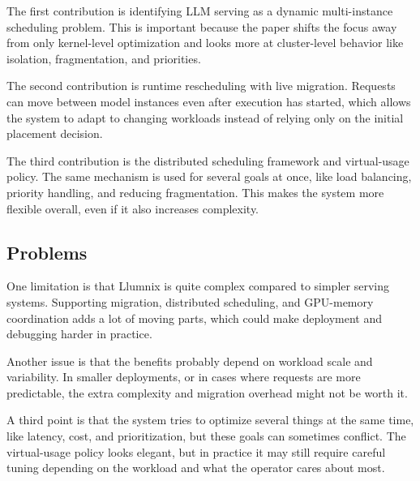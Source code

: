 \documentclass[a4paper, 12pt]{article}
\begin{document}
The first contribution is identifying LLM serving as a dynamic multi-instance scheduling problem. This is important because the paper shifts the focus away from only kernel-level optimization and looks more at cluster-level behavior like isolation, fragmentation, and priorities.

The second contribution is runtime rescheduling with live migration. Requests can move between model instances even after execution has started, which allows the system to adapt to changing workloads instead of relying only on the initial placement decision.

The third contribution is the distributed scheduling framework and virtual-usage policy. The same mechanism is used for several goals at once, like load balancing, priority handling, and reducing fragmentation. This makes the system more flexible overall, even if it also increases complexity.

\subsection{Problems}

One limitation is that Llumnix is quite complex compared to simpler serving systems. Supporting migration, distributed scheduling, and GPU-memory coordination adds a lot of moving parts, which could make deployment and debugging harder in practice.

Another issue is that the benefits probably depend on workload scale and variability. In smaller deployments, or in cases where requests are more predictable, the extra complexity and migration overhead might not be worth it.

A third point is that the system tries to optimize several things at the same time, like latency, cost, and prioritization, but these goals can sometimes conflict. The virtual-usage policy looks elegant, but in practice it may still require careful tuning depending on the workload and what the operator cares about most.
\end{document}
